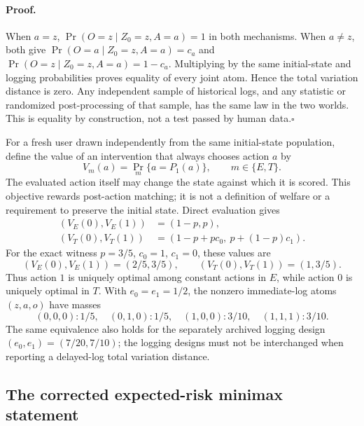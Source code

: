 \paragraph{Proof.}
When $a=z$, $\Pr(O=z\mid Z_0=z,A=a)=1$ in both mechanisms. When $a\ne z$,
both give $\Pr(O=a\mid Z_0=z,A=a)=c_a$ and
$\Pr(O=z\mid Z_0=z,A=a)=1-c_a$. Multiplying by the same initial-state and
logging probabilities proves equality of every joint atom. Hence the total
variation distance is zero. Any independent sample of historical logs, and
any statistic or randomized post-processing of that sample, has the same
law in the two worlds. This is equality by construction, not a test passed
by human data.\hfill$\square$

For a fresh user drawn independently from the same initial-state population,
define the value of an intervention that always chooses action $a$ by
\begin{equation}
 V_m(a)=\Pr_m\{a=P_1(a)\},\qquad m\in\{E,T\}.
 \label{eq:theory:persistent-value}
\end{equation}
The evaluated action itself may change the state against which it is scored.
This objective rewards post-action matching; it is not a definition of welfare
or a requirement to preserve the initial state. Direct evaluation gives
\begin{align}
 (V_E(0),V_E(1))&=(1-p,p),\\
 (V_T(0),V_T(1))&=(1-p+pc_0,\ p+(1-p)c_1).
\end{align}
For the exact witness $p=3/5$, $c_0=1$, $c_1=0$, these values are
\begin{equation}
 (V_E(0),V_E(1))=(2/5,3/5),\qquad
 (V_T(0),V_T(1))=(1,3/5).
 \label{eq:theory:witness-values}
\end{equation}
Thus action $1$ is uniquely optimal among constant actions in $E$, while
action $0$ is uniquely optimal in $T$. With $e_0=e_1=1/2$, the nonzero
immediate-log atoms $(z,a,o)$ have masses
\begin{equation}
 (0,0,0):1/5,\quad (0,1,0):1/5,\quad
 (1,0,0):3/10,\quad (1,1,1):3/10.
\end{equation}
The same equivalence also holds for the separately archived logging design
$(e_0,e_1)=(7/20,7/10)$; the logging designs must not be interchanged when
reporting a delayed-log total variation distance.

\subsection{The corrected expected-risk minimax statement}
\label{app:theory:minimax}


